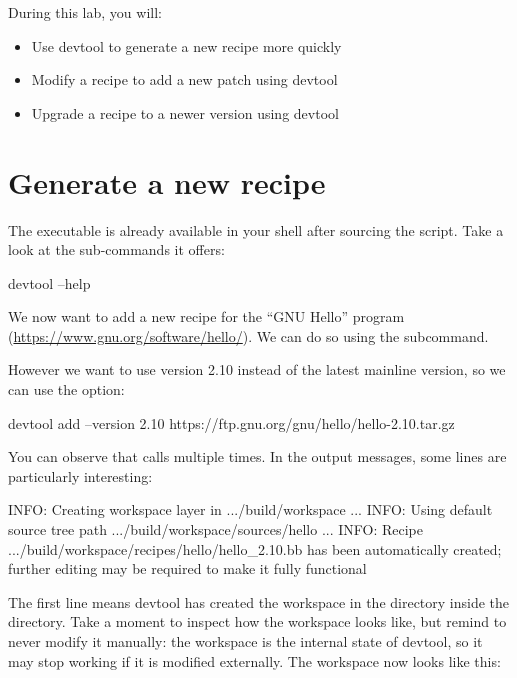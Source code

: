 
During this lab, you will:
\begin{itemize}
  \item Use devtool to generate a new recipe more quickly
  \item Modify a recipe to add a new patch using devtool
  \item Upgrade a recipe to a newer version using devtool
\end{itemize}

\section{Generate a new recipe}

The  executable is already available in your shell after
sourcing the  script. Take a look at the
sub-commands it offers:
\begin{bashinput}
devtool --help
\end{bashinput}

We now want to add a new recipe for the ``GNU Hello'' program
(\url{https://www.gnu.org/software/hello/}). We can do so using the
 subcommand.

However we want to use version 2.10 instead of the latest mainline version,
so we can use the  option:
\begin{bashinput}
devtool add --version 2.10 https://ftp.gnu.org/gnu/hello/hello-2.10.tar.gz
\end{bashinput}

You can observe that  calls  multiple times. In the output messages, some lines are particularly interesting:

\begin{bashinput}
INFO: Creating workspace layer in .../build/workspace
...
INFO: Using default source tree path .../build/workspace/sources/hello
...
INFO: Recipe .../build/workspace/recipes/hello/hello_2.10.bb has been automatically created; further editing may be required to make it fully functional
\end{bashinput}

The first  line means devtool has created the workspace in the
 directory inside the  directory. Take a moment
to inspect how the workspace looks like, but remind to never modify it
manually: the workspace is the internal state of devtool, so it may stop
working if it is modified externally. The workspace now looks like this:

